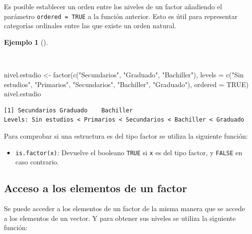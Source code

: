 \documentclass[
  spanish,
  a4paper,
]{scrreport}
\newenvironment{Shaded}{\begin{snugshade}}{\end{snugshade}}
\newcommand{\AttributeTok}[1]{\textcolor[rgb]{0.40,0.45,0.13}{#1}}
\newcommand{\ConstantTok}[1]{\textcolor[rgb]{0.56,0.35,0.01}{#1}}
\newcommand{\FunctionTok}[1]{\textcolor[rgb]{0.28,0.35,0.67}{#1}}
\newcommand{\NormalTok}[1]{\textcolor[rgb]{0.00,0.23,0.31}{#1}}
\newcommand{\OtherTok}[1]{\textcolor[rgb]{0.00,0.23,0.31}{#1}}
\newcommand{\StringTok}[1]{\textcolor[rgb]{0.13,0.47,0.30}{#1}}
\providecommand{\tightlist}{%
  \setlength{\itemsep}{0pt}\setlength{\parskip}{0pt}}
\theoremstyle{definition}
\theoremstyle{definition}
\newtheorem{example}{Ejemplo}[chapter]
\theoremstyle{remark}
\begin{document}
Es posible establecer un orden entre los niveles de un factor añadiendo
el parámetro \texttt{ordered\ =\ TRUE} a la función anterior. Esto es
útil para representar categorías ordinales entre las que existe un orden
natural.

\begin{example}[]\protect\hypertarget{exm-creacion-factor-ordenado}{}\label{exm-creacion-factor-ordenado}

~

\begin{Shaded}
\begin{Highlighting}[]
\NormalTok{nivel.estudio }\OtherTok{\textless{}{-}} \FunctionTok{factor}\NormalTok{(}\FunctionTok{c}\NormalTok{(}\StringTok{"Secundarios"}\NormalTok{, }\StringTok{"Graduado"}\NormalTok{, }\StringTok{"Bachiller"}\NormalTok{), }\AttributeTok{levels =} \FunctionTok{c}\NormalTok{(}\StringTok{"Sin estudios"}\NormalTok{, }\StringTok{"Primarios"}\NormalTok{, }\StringTok{"Secundarios"}\NormalTok{, }\StringTok{"Bachiller"}\NormalTok{, }\StringTok{"Graduado"}\NormalTok{), }\AttributeTok{ordered =} \ConstantTok{TRUE}\NormalTok{)}
\NormalTok{nivel.estudio}
\end{Highlighting}
\end{Shaded}

\begin{verbatim}
[1] Secundarios Graduado    Bachiller  
Levels: Sin estudios < Primarios < Secundarios < Bachiller < Graduado
\end{verbatim}

\end{example}

Para comprobar si una estructura es del tipo factor se utiliza la
siguiente función:

\begin{itemize}
\tightlist
\item
  \texttt{is.factor(x)}: Devuelve el booleano \texttt{TRUE} si
  \texttt{x} es del tipo factor, y \texttt{FALSE} en caso contrario.
\end{itemize}

\subsection{Acceso a los elementos de un
factor}\label{acceso-a-los-elementos-de-un-factor}

Se puede acceder a los elementos de un factor de la misma manera que se
accede a los elementos de un vector. Y para obtener sus niveles se
utiliza la siguiente función:
\end{document}
